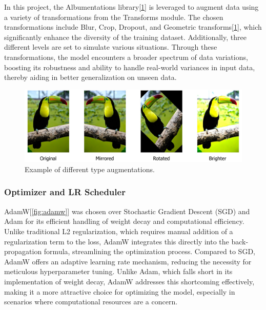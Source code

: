 \documentclass[10pt,twocolumn,letterpaper]{article}
\begin{document}
In this project, the Albumentations library\cite{buslaev2020albumentations}[\ref{fig:album}] is leveraged to augment data using a variety of transformations from the Transforms module. The chosen transformations include Blur, Crop, Dropout, and Geometric transforms[\ref{fig:album}], which significantly enhance the diversity of the training dataset. Additionally, three different levels are set to simulate various situations. Through these transformations, the model encounters a broader spectrum of data variations, boosting its robustness and ability to handle real-world variances in input data, thereby aiding in better generalization on unseen data.

\begin{figure}[h]
	\centering
	\includegraphics[width=\columnwidth]{album}
	\caption{Example of different type augmentations.}
	\label{fig:album}
\end{figure}

\subsubsection{Optimizer and LR Scheduler}
AdamW\cite{loshchilov2017decoupled, loshchilov2018fixing}[\ref{fig:adamw}] was chosen over Stochastic Gradient Descent (SGD)\cite{ruder2016overview} and Adam\cite{kingma2014adam} for its efficient handling of weight decay and computational efficiency. Unlike traditional L2 regularization, which requires manual addition of a regularization term to the loss, AdamW integrates this directly into the back-propagation formula, streamlining the optimization process. Compared to SGD, AdamW offers an adaptive learning rate mechanism, reducing the necessity for meticulous hyperparameter tuning. Unlike Adam, which falls short in its implementation of weight decay, AdamW addresses this shortcoming effectively, making it a more attractive choice for optimizing the model, especially in scenarios where computational resources are a concern\cite{loshchilov2017decoupled, loshchilov2018fixing}.
\end{document}
